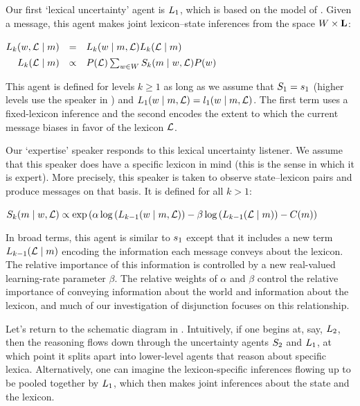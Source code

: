 \documentclass[12pt,twoside]{article}
\renewcommand{\_}{\textbf{\textunderscore\hspace{-4pt}\textunderscore\hspace{-3pt}\textunderscore\hspace{-4pt}\textunderscore}\hspace{0.5pt}}			%
\begin{document}
Our first `lexical uncertainty' agent is $\ListenerK[1]$, which is
based on the model of \citet{Smith:Goodman:Frank:2013}. Given a
message, this agent makes joint lexicon--state inferences from
the space $\States \times \LexSet$:
%
\begin{exe}
  \ex\label{L1}%
    \setlength{\arraycolsep}{2pt}%
    $\begin{array}[t]{@{} r c l}
      \ListenerK(\state, \Lex \given \msg) 
      &=&
      \ListenerK(\state \given \msg, \Lex) \ListenerK(\Lex \given \msg) 
      \\[1ex]
      \ListenerK(\Lex \given \msg) 
      &\propto& 
      \Prior(\Lex) \sum_{\state\in\States} \SpeakerK(\msg \given \state, \Lex)\Prior(\state)
    \end{array}$
\end{exe}
%
This agent is defined for levels $k \geqslant 1$ as long as we assume
that $\SpeakerK[1] = \speakerOne$ (higher levels use the speaker in
) and
$\ListenerK[1](\state \given \msg, \Lex) = \listenerOne(\state \given
\msg, \Lex)$.
The first term uses a fixed-lexicon inference and the second encodes
the extent to which the current message biases in favor of the lexicon $\Lex$.

Our `expertise' speaker responds to this lexical uncertainty listener.
We assume that this speaker does have a specific lexicon in mind (this
is the sense in which it is expert).  More precisely, this speaker is
taken to observe state--lexicon pairs and produce messages on that
basis. It is defined for all $k > 1$:

\begin{exe}  
  \ex\label{Sk}%
   $\SpeakerK(\msg \given \state, \Lex) \propto \exponential \left( \alpha\log\left(\ListenerK[k-1](\state \given \msg, \Lex)\right)  -  \beta\log\left(\ListenerK[k-1](\Lex\given\msg)\right) - \Costs(\msg) \right)$
\end{exe}
%
In broad terms, this agent is similar to $\speakerOne$ except that it
includes a new term $\ListenerK[k-1](\Lex\given\msg)$ encoding the
information each message conveys about the lexicon. The relative
importance of this information is controlled by a new real-valued
learning-rate parameter $\beta$. The relative weights of $\alpha$ and
$\beta$ control the relative importance of conveying information about
the world and information about the lexicon, and much of our
investigation of disjunction focuses on this relationship.

Let's return to the schematic diagram in
. Intuitively, if one begins at, say,
$\ListenerK[2]$, then the reasoning flows down through the uncertainty
agents $\SpeakerK[2]$ and $\ListenerK[1]$, at which point it splits
apart into lower-level agents that reason about specific lexica.
Alternatively, one can imagine the lexicon-specific inferences flowing
up to be pooled together by $\ListenerK[1]$, which then makes joint
inferences about the state and the lexicon.
\end{document}
